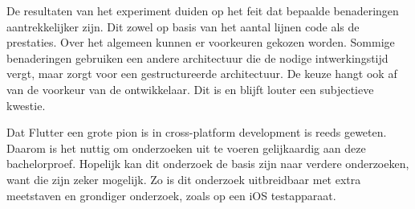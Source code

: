 De resultaten van het experiment duiden op het feit dat bepaalde benaderingen aantrekkelijker zijn. Dit zowel op basis van het aantal lijnen code als de prestaties. Over het algemeen kunnen er voorkeuren gekozen worden. Sommige benaderingen gebruiken een andere architectuur die de nodige intwerkingstijd vergt, maar zorgt voor een gestructureerde architectuur. De keuze hangt ook af van de voorkeur van de ontwikkelaar. Dit is en blijft louter een subjectieve kwestie.\newline

Dat Flutter een grote pion is in cross-platform development is reeds geweten. Daarom is het nuttig om onderzoeken uit te voeren gelijkaardig aan deze bachelorproef. Hopelijk kan dit onderzoek de basis zijn naar verdere onderzoeken, want die zijn zeker mogelijk. Zo is dit onderzoek uitbreidbaar met extra meetstaven en grondiger onderzoek, zoals op een iOS testapparaat.

